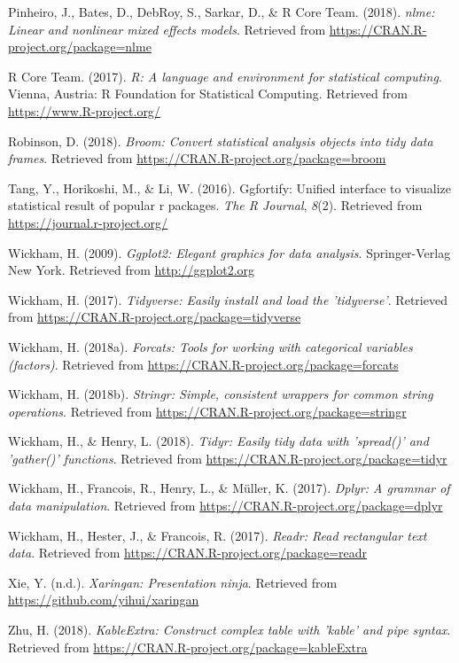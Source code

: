 \documentclass[man]{apa6}
\theoremstyle{definition}
\theoremstyle{definition}
\theoremstyle{definition}
\theoremstyle{remark}
\begin{document}
\hypertarget{ref-R-nlme}{}
Pinheiro, J., Bates, D., DebRoy, S., Sarkar, D., \& R Core Team. (2018).
\emph{nlme: Linear and nonlinear mixed effects models}. Retrieved from
\url{https://CRAN.R-project.org/package=nlme}

\hypertarget{ref-R-base}{}
R Core Team. (2017). \emph{R: A language and environment for statistical
computing}. Vienna, Austria: R Foundation for Statistical Computing.
Retrieved from \url{https://www.R-project.org/}

\hypertarget{ref-R-broom}{}
Robinson, D. (2018). \emph{Broom: Convert statistical analysis objects
into tidy data frames}. Retrieved from
\url{https://CRAN.R-project.org/package=broom}

\hypertarget{ref-R-ggfortify}{}
Tang, Y., Horikoshi, M., \& Li, W. (2016). Ggfortify: Unified interface
to visualize statistical result of popular r packages. \emph{The R
Journal}, \emph{8}(2). Retrieved from
\url{https://journal.r-project.org/}

\hypertarget{ref-R-ggplot2}{}
Wickham, H. (2009). \emph{Ggplot2: Elegant graphics for data analysis}.
Springer-Verlag New York. Retrieved from \url{http://ggplot2.org}

\hypertarget{ref-R-tidyverse}{}
Wickham, H. (2017). \emph{Tidyverse: Easily install and load the
'tidyverse'}. Retrieved from
\url{https://CRAN.R-project.org/package=tidyverse}

\hypertarget{ref-R-forcats}{}
Wickham, H. (2018a). \emph{Forcats: Tools for working with categorical
variables (factors)}. Retrieved from
\url{https://CRAN.R-project.org/package=forcats}

\hypertarget{ref-R-stringr}{}
Wickham, H. (2018b). \emph{Stringr: Simple, consistent wrappers for
common string operations}. Retrieved from
\url{https://CRAN.R-project.org/package=stringr}

\hypertarget{ref-R-tidyr}{}
Wickham, H., \& Henry, L. (2018). \emph{Tidyr: Easily tidy data with
'spread()' and 'gather()' functions}. Retrieved from
\url{https://CRAN.R-project.org/package=tidyr}

\hypertarget{ref-R-dplyr}{}
Wickham, H., Francois, R., Henry, L., \& Müller, K. (2017). \emph{Dplyr:
A grammar of data manipulation}. Retrieved from
\url{https://CRAN.R-project.org/package=dplyr}

\hypertarget{ref-R-readr}{}
Wickham, H., Hester, J., \& Francois, R. (2017). \emph{Readr: Read
rectangular text data}. Retrieved from
\url{https://CRAN.R-project.org/package=readr}

\hypertarget{ref-R-xaringan}{}
Xie, Y. (n.d.). \emph{Xaringan: Presentation ninja}. Retrieved from
\url{https://github.com/yihui/xaringan}

\hypertarget{ref-R-kableExtra}{}
Zhu, H. (2018). \emph{KableExtra: Construct complex table with 'kable'
and pipe syntax}. Retrieved from
\url{https://CRAN.R-project.org/package=kableExtra}

\endgroup
\end{document}
